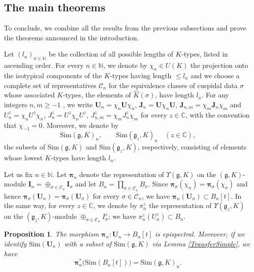 \documentclass{amsart}
\newtheorem{proposition}[theorem]{Proposition}
\theoremstyle{definition}
\begin{document}
\subsection{The main theorems}\label{main_theorems}

To conclude, we combine all the results from the previous subsections and prove the theorems announced in the introduction.

Let $(l_n)_{n \in \mathbb{N}}$ be the collection of all possible lengths of $K$-types, listed in ascending order. For every $n \in \mathbb{N}$, we denote by $\chi_n \in U(K)$ the projection onto the isotypical components of the $K$-types having length $\leq l_n$ and we choose a complete set of representatives $\mathcal{C}_n$ for the equivalence classes of cuspidal data $\sigma$ whose associated $K$-types, the elements of $\widehat{K}(\sigma)$, have length $l_n$. For any integers $n,m\geq -1$ , we write $\bm{U}_n = \chi_n \bm{U} \chi_n$, $\bm{J}_n = \bm{U}\chi_n \bm{U}$, $\bm{J}_{n,m} = \chi_m \bm{J}_n \chi_m$ and $U^z_n = \chi_n U^z \chi_n$, $J^z_n = U^z \chi_n U^z$, $J^z_{n,m} = \chi_m J^z_n \chi_m$ for every $z \in \mathbb{C}$, with the convention that $\chi_{-1} = 0$. Moreover, we denote by
\[\mathrm{Sim}(\bm{\mathfrak{g}},K)_n, \qquad \mathrm{Sim}(\bm{\mathfrak{g}}_z,K)_n \quad (z \in \mathbb{C}),\]
the subsets of $\mathrm{Sim}(\bm{\mathfrak{g}},K)$ and $\mathrm{Sim}(\bm{\mathfrak{g}}_z,K)$, respectively, consisting of elements whose lowest $K$-types have length $l_n$.

Let us fix $n \in \mathbb{N}$. Let $\bm{\pi}_n$ denote the representation of $\Upsilon(\bm{\mathfrak{g}},K)$ on the $(\bm{\mathfrak{g}},K)$-module $\bm{I}_n = \oplus_{\sigma \in \mathcal{C}_n} \bm{I}_\sigma$ and let $B_n = \prod_{\sigma \in \mathcal{C}_n} B_\sigma$. Since $\bm{\pi}_\sigma(\chi_n) = \bm{\pi}_\sigma(\chi_\sigma)$ and hence $\bm{\pi}_\sigma(\bm{U}_n) = \bm{\pi}_\sigma(\bm{U}_\sigma)$ for every $\sigma \in \mathcal{C}_n$, we have $\bm{\pi}_n(\bm{U}_n) \subset  B_n[t]$. In the same way, for every $z \in \mathbb{C}$, we denote by $\pi_n^z$ the representation of $\Upsilon(\bm{\mathfrak{g}}_z,K)$ on the $(\bm{\mathfrak{g}}_z,K)$-module $\oplus_{\sigma \in \mathcal{C}_n} I^z_\sigma$; we have $\pi_n^z(U_n^z) \subset B_n$.

\begin{proposition}\label{isospectral_augmented}
    The morphism $\bm{\pi}_n : \bm{U}_n \to B_n[t]$ is epispectral. Moreover, if we identify $\mathrm{Sim}(\bm{U}_n)$ with a subset of $\mathrm{Sim}(\bm{\mathfrak{g}},K)$ via Lemma \ref{TransferSimple}, we have $$\bm{\pi}_n^*\big( \mathrm{Sim}(B_n[t])\big) = \mathrm{Sim}(\bm{\mathfrak{g}},K)_n.$$
\end{proposition}
\end{document}
